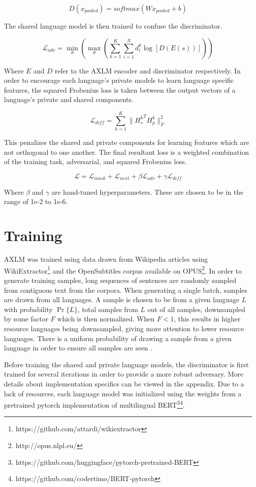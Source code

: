 \documentclass[10pt,letterpaper,twocolumn]{article}
\begin{document}
$$D(x_{pooled}) = softmax(W x_{pooled} + b)$$

The shared language model is then trained to confuse the discriminator.

$$\mathcal{L}_{adv} = \min_\theta \left( \max_\theta ( \sum_{k=1}^K \sum_{i=1}^N d_i^k \log [D(E(s))] ) \right)$$

Where $E$ and $D$ refer to the AXLM encoder and discriminator respectively.  In order to encourage each language's private models to learn language specific features, the squared Frobenius loss is taken between the output vectors of a language's private and shared components.

$$\mathcal{L}_{diff} = \sum_{k=1}^K \lVert {H_s^k}^T H_p^k \rVert_F^2$$

This penalizes the shared and private components for learning features which are not orthogonal to one another.  The final resultant loss is a weighted combination of the training task, adversarial, and squared Frobenius loss.

$$\mathcal{L} = \mathcal{L}_{mask} + \mathcal{L}_{next} + \beta \mathcal{L}_{adv} + \gamma \mathcal{L}_{diff}$$

Where $\beta$ and $\gamma$ are hand-tuned hyperparameters.  These are chosen to be in the range of 1e-2 to 1e-6.

\section{Training}
AXLM was trained using data drawn from Wikipedia articles using WikiExtractor\footnote{https://github.com/attardi/wikiextractor} and the OpenSubtitles corpus available on OPUS\footnote{http://opus.nlpl.eu/}.  In order to generate training samples, long sequences of sentences are randomly sampled from contiguous text from the corpora.  When generating a single batch, samples are drawn from all languages.  A sample is chosen to be from a given language $L$ with probability $\Pr\{L\}$, total samples from $L$ out of all samples, downsampled by some factor $F$ which is then normalized.  When $F < 1$, this results in higher resource languages being downsampled, giving more attention to lower resource languages.  There is a uniform probability of drawing a sample from a given language in order to ensure all samples are seen \cite{}.

Before training the shared and private language models, the discriminator is first trained for several iterations in order to provide a more robust adversary.  More details about implementation specifics can be viewed in the appendix.  Due to a lack of resources, each language model was initialized using the weights from a pretrained pytorch implementation of multilingual BERT\footnote{https://github.com/huggingface/pytorch-pretrained-BERT}\footnote{https://github.com/codertimo/BERT-pytorch}.
\end{document}
